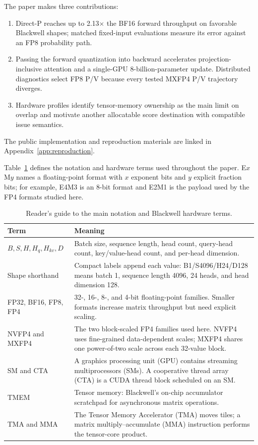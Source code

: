 The paper makes three contributions:
\begin{enumerate}
  \item Direct-P reaches up to 2.13$\times$ the BF16 forward throughput on
  favorable Blackwell shapes; matched fixed-input evaluations measure its
  error against an FP8 probability path.
  \item Passing the forward quantization into backward accelerates
  projection-inclusive attention and a
  single-GPU 8-billion-parameter update.  Distributed diagnostics select FP8
  P/V because every tested MXFP4 P/V trajectory diverges.
  \item Hardware profiles identify tensor-memory ownership as the main limit on
  overlap and motivate another allocatable score destination with compatible
  issue semantics.
\end{enumerate}

The public implementation and reproduction materials are linked in
Appendix~\ref{app:reproduction}.

Table~\ref{tab:reader-notation} defines the notation and hardware terms used
throughout the paper.  E$x$M$y$ names a floating-point format with $x$
exponent bits and $y$ explicit fraction bits; for example, E4M3 is an 8-bit
format and E2M1 is the payload used by the FP4 formats studied here.

\begin{table}[htbp]
\centering
\caption{Reader's guide to the main notation and Blackwell hardware terms.}
\label{tab:reader-notation}
\small
\begin{tabularx}{\textwidth}{p{}X}
\toprule
Term & Meaning \\
\midrule
$B,S,H,H_q,H_{kv},D$ & Batch size, sequence length, head count, query-head
count, key/value-head count, and per-head dimension. \\
Shape shorthand & Compact labels append each value: B1/S4096/H24/D128 means
batch 1, sequence length 4096, 24 heads, and head dimension 128. \\
FP32, BF16, FP8, FP4 & 32-, 16-, 8-, and 4-bit floating-point families.
Smaller formats increase matrix throughput but need explicit scaling. \\
NVFP4 and MXFP4 & The two block-scaled FP4 families used here.  NVFP4 uses
fine-grained data-dependent scales; MXFP4 shares one power-of-two scale across
each 32-value block. \\
SM and CTA & A graphics processing unit (GPU) contains streaming
multiprocessors (SMs).  A cooperative thread array (CTA) is a CUDA thread
block scheduled on an SM. \\
TMEM & Tensor memory: Blackwell's on-chip accumulator scratchpad for
asynchronous matrix operations. \\
TMA and MMA & The Tensor Memory Accelerator (TMA) moves tiles; a matrix
multiply--accumulate (MMA) instruction performs the tensor-core product. \\
\bottomrule
\end{tabularx}
\end{table}

